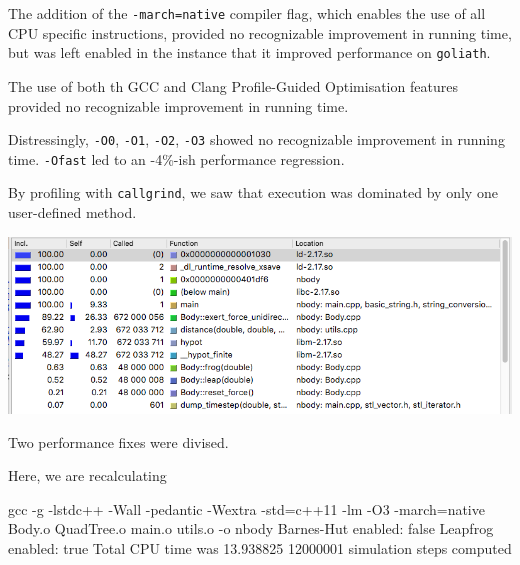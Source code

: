 \documentclass[11pt,a4paper]{article}
\begin{document}
The addition of the 
\texttt{-march=native} compiler flag, which enables the use of all CPU specific instructions, provided no recognizable improvement in running time, but was left enabled in the instance that it improved performance on \texttt{goliath}.

The use of both th GCC and Clang Profile-Guided Optimisation features provided no recognizable improvement in running time.

Distressingly, \texttt{-O0}, \texttt{-O1}, \texttt{-O2}, \texttt{-O3} showed no recognizable improvement in running time. \texttt{-Ofast} led to an -4\%-ish performance regression.

By profiling with \texttt{callgrind}, we saw that execution was dominated by only one user-defined method. 

\includegraphics[width=\textwidth]{profile}


Two performance fixes were divised.


Here, we are recalculating 


gcc -g -lstdc++ -Wall -pedantic -Wextra -std=c++11 -lm -O3 -march=native Body.o
QuadTree.o main.o utils.o -o nbody
Barnes-Hut enabled: false
Leapfrog enabled: true
Total CPU time was 13.938825
12000001 simulation steps computed

\medskip
 


\end{document}
